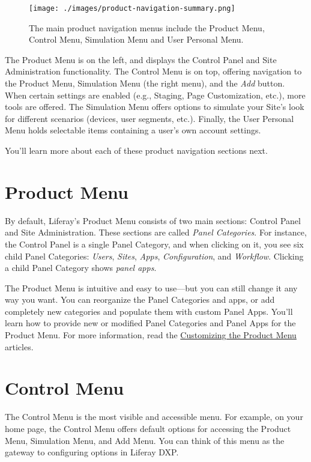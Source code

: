 \begin{figure}
\centering
\texttt{[image: ./images/product-navigation-summary.png]}
\caption{The main product navigation menus include the Product Menu,
Control Menu, Simulation Menu and User Personal Menu.}
\end{figure}

The Product Menu is on the left, and displays the Control Panel and Site
Administration functionality. The Control Menu is on top, offering
navigation to the Product Menu, Simulation Menu (the right menu), and
the \emph{Add} button. When certain settings are enabled (e.g., Staging,
Page Customization, etc.), more tools are offered. The Simulation Menu
offers options to simulate your Site's look for different scenarios
(devices, user segments, etc.). Finally, the User Personal Menu holds
selectable items containing a user's own account settings.

You'll learn more about each of these product navigation sections next.

\section{Product Menu}\label{product-menu}

By default, Liferay's Product Menu consists of two main sections:
Control Panel and Site Administration. These sections are called
\emph{Panel Categories}. For instance, the Control Panel is a single
Panel Category, and when clicking on it, you see six child Panel
Categories: \emph{Users}, \emph{Sites}, \emph{Apps},
\emph{Configuration}, and \emph{Workflow}. Clicking a child Panel
Category shows \emph{panel apps}.

The Product Menu is intuitive and easy to use---but you can still change
it any way you want. You can reorganize the Panel Categories and apps,
or add completely new categories and populate them with custom Panel
Apps. You'll learn how to provide new or modified Panel Categories and
Panel Apps for the Product Menu. For more information, read the
\href{/docs/7-2/customization/-/knowledge_base/c/customizing-the-product-menu}{Customizing
the Product Menu} articles.

\section{Control Menu}\label{control-menu}

The Control Menu is the most visible and accessible menu. For example,
on your home page, the Control Menu offers default options for accessing
the Product Menu, Simulation Menu, and Add Menu. You can think of this
menu as the gateway to configuring options in Liferay DXP.

